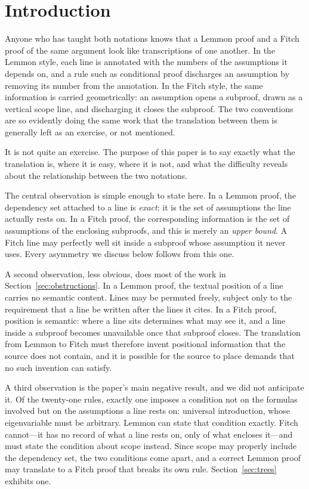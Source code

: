 \documentclass[11pt]{article}
\theoremstyle{plain}
\theoremstyle{definition}
\theoremstyle{remark}
\begin{document}
\section{Introduction}

Anyone who has taught both notations knows that a Lemmon proof and a Fitch
proof of the same argument look like transcriptions of one another. In the
Lemmon style, each line is annotated with the numbers of the assumptions it
depends on, and a rule such as conditional proof discharges an assumption by
removing its number from the annotation. In the Fitch style, the same
information is carried geometrically: an assumption opens a subproof, drawn as
a vertical scope line, and discharging it closes the subproof. The two
conventions are so evidently doing the same work that the translation between
them is generally left as an exercise, or not mentioned.

It is not quite an exercise. The purpose of this paper is to say exactly what
the translation is, where it is easy, where it is not, and what the difficulty
reveals about the relationship between the two notations.

The central observation is simple enough to state here. In a Lemmon proof, the
dependency set attached to a line is \emph{exact}: it is the set of
assumptions the line actually rests on. In a Fitch proof, the corresponding
information is the set of assumptions of the enclosing subproofs, and this is
merely an \emph{upper bound}. A Fitch line may perfectly well sit inside a
subproof whose assumption it never uses. Every asymmetry we discuss below
follows from this one.

A second observation, less obvious, does most of the work in
Section~\ref{sec:obstructions}. In a Lemmon proof, the textual position of a
line carries no semantic content. Lines may be permuted freely, subject only
to the requirement that a line be written after the lines it cites. In a Fitch
proof, position is semantic: where a line sits determines what may see it, and
a line inside a subproof becomes unavailable once that subproof closes. The
translation from Lemmon to Fitch must therefore invent positional information
that the source does not contain, and it is possible for the source to place
demands that no such invention can satisfy.

A third observation is the paper's main negative result, and we did not
anticipate it. Of the twenty-one rules, exactly one imposes a condition not on
the formulas involved but on the assumptions a line rests on: universal
introduction, whose eigenvariable must be arbitrary. Lemmon can state that
condition exactly. Fitch cannot---it has no record of what a line rests on,
only of what encloses it---and must state the condition about scope instead.
Since scope may properly include the dependency set, the two conditions come
apart, and a correct Lemmon proof may translate to a Fitch proof that breaks
its own rule. Section~\ref{sec:trees} exhibits one.
\end{document}
